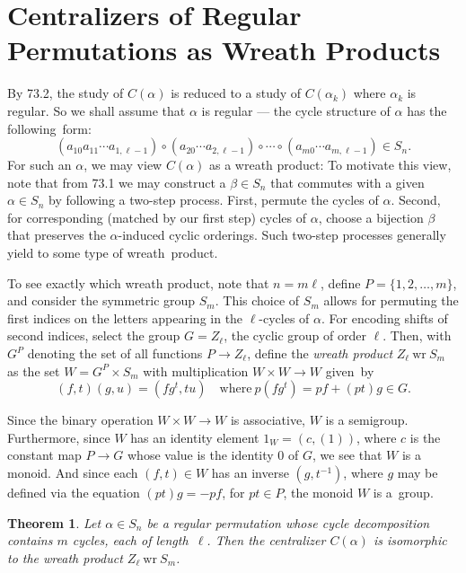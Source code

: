 \documentclass{surv-l}
\numberwithin{equation}{section}
\numberwithin{table}{section}
\numberwithin{figure}{section}
\theoremstyle{plain}
\newtheorem{theorem}[equation]{Theorem}
\theoremstyle{definition}
\begin{document}
\section{Centralizers of Regular Permutations as Wreath Products}\label{secA.74}

By 73.2, the study of $C(\alpha)$ is reduced to a study of
$C(\alpha_{k})$ where $\alpha_{k}$ is regular. So we shall
assume that $\alpha$ is regular --- the cycle structure of
$\alpha$ has the following~form:
\[
(a_{10}a_{11}\cdots a_{1,\ell-1})\circ(a_{20}\cdots a_{2,\ell-1})\circ\cdots\circ(a_{m0}\cdots a_{m,\ell-1})\in S_{n}.
\]
For such an $\alpha$, we may view $C(\alpha)$ as a wreath
product: To motivate this view, note that from 73.1 we may
construct a $\beta\in S_{n}$ that commutes with a given
$\alpha\in S_{n}$ by following a two-step process. First,
permute the cycles of $\alpha$. Second, for corresponding
(matched by our first step) cycles of $\alpha$, choose a
bijection $\beta$ that preserves the $\alpha$-induced cyclic
orderings. Such two-step processes generally yield to some
type of wreath~product.

To see exactly which wreath product, note that $n =m\ell$, define
$P= \{1,2,\ldots, m\}$, and consider the symmetric group $S_{m}$.
This choice of $S_{m}$ allows for permuting the first indices on
the letters appearing in the $\ell$-cycles of $\alpha$. For
encoding shifts of second indices, select the group $G=Z_{\ell}$,
the cyclic group of order $\ell$. Then, with $G^{P}$ denoting the
set of all functions $P\rightarrow Z_{\ell}$, define the
\emph{wreath product} $Z_{\ell}\
\mathrm{wr}\ S_{m}$ as the set $W=G^{P}\times S_{m}$ with
multiplication $W\times W\rightarrow W$ given~by
\[
(f, t)(g, u)=(fg^{t}, tu)\quad \mathrm{where}\
p(fg^{t})=pf+(pt)g\in G.
\]

Since the binary operation $W\times W\rightarrow W$ is
associative, $W$ is a semigroup. Furthermore, since $W$ has an
identity element $1_{W}= (c,(1))$, where $c$ is the constant
map $P\rightarrow G$ whose value is the identity $0$ of $G$,
we see that $W$ is a monoid. And since each $(f, t)\in W$ has
an inverse $(g,t^{-1})$, where $g$ may be defined via the
equation $(pt)g=-pf$, for $pt\in P$, the monoid $W$ is
a~group.

\begin{theorem}\label{thmA.74.1}
Let $\alpha\in S_{n}$ be a regular permutation\index{regular
permutation} whose cycle decomposition contains $m$ cycles, each
of length~$\ell$. Then the centralizer $C(\alpha)$ is isomorphic
to the wreath product $Z_{\ell}\ \mathrm{wr}\ S_{m}$.
\end{theorem}
\end{document}

